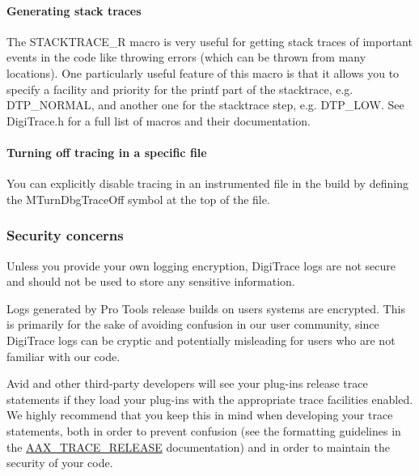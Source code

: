 \hypertarget{a00834_digitrace__advancedlogging__stacktrace}{}\paragraph{Generating stack traces}\label{a00834_digitrace__advancedlogging__stacktrace}
 The {\ttfamily S\+T\+A\+C\+K\+T\+R\+A\+C\+E\+\_\+R} macro is very useful for getting stack traces of important events in the code like throwing errors (which can be thrown from many locations). One particularly useful feature of this macro is that it allows you to specify a facility and priority for the printf part of the stacktrace, e.\+g. {\ttfamily D\+T\+P\+\_\+\+N\+O\+R\+M\+AL}, and another one for the stacktrace step, e.\+g. {\ttfamily D\+T\+P\+\_\+\+L\+OW}. See Digi\+Trace.\+h for a full list of macros and their documentation.

\hypertarget{a00834_digitrace__advancedlogging__disabletracing}{}\paragraph{Turning off tracing in a specific file}\label{a00834_digitrace__advancedlogging__disabletracing}
 You can explicitly disable tracing in an instrumented file in the build by defining the {\ttfamily M\+Turn\+Dbg\+Trace\+Off} symbol at the top of the file.

\hypertarget{a00834_digitrace__tracingfromplugins__security}{}\subsubsection{Security concerns}\label{a00834_digitrace__tracingfromplugins__security}
 Unless you provide your own logging encryption, Digi\+Trace logs are not secure and should not be used to store any sensitive information.

 Logs generated by Pro Tools release builds on users\textquotesingle{} systems are encrypted. This is primarily for the sake of avoiding confusion in our user community, since Digi\+Trace logs can be cryptic and potentially misleading for users who are not familiar with our code.

 Avid and other third-\/party developers will see your plug-\/ins\textquotesingle{} release trace statements if they load your plug-\/ins with the appropriate trace facilities enabled. We highly recommend that you keep this in mind when developing your trace statements, both in order to prevent confusion (see the formatting guidelines in the \mbox{\hyperlink{a00395_ac2aa820ece56bb59140ad561218db4b3}{A\+A\+X\+\_\+\+T\+R\+A\+C\+E\+\_\+\+R\+E\+L\+E\+A\+SE}} documentation) and in order to maintain the security of your code.



